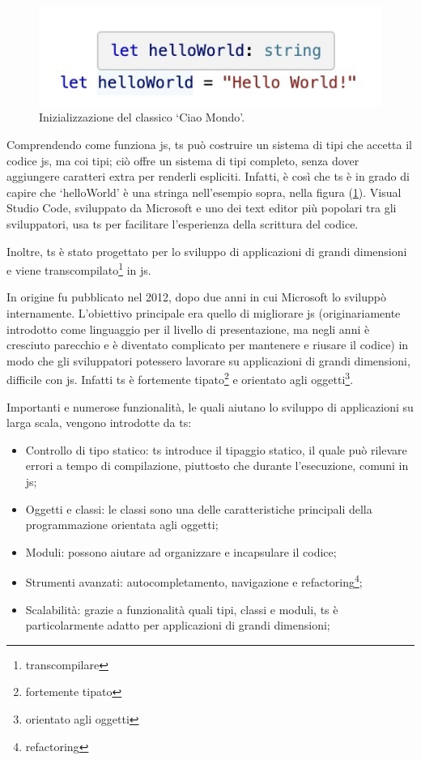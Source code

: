 \begin{figure}[H]
\centering
\includegraphics[width=.8\textwidth]{Images/ts hello.jpg}
\caption{\label{fig:hello}Inizializzazione del classico `Ciao Mondo'.}
\end{figure}

Comprendendo come funziona \acrlong{js}, \acrlong{ts} può costruire un sistema di tipi che accetta il codice \acrlong{js}, ma coi tipi; ciò offre un sistema di tipi completo, senza dover aggiungere caratteri extra per renderli espliciti. Infatti, è così che \acrlong{ts} è in grado di capire che `helloWorld' è una stringa nell'esempio sopra, nella figura (\ref{fig:hello}).
Visual Studio Code, sviluppato da Microsoft e uno dei text editor più popolari tra gli sviluppatori, usa \acrlong{ts} per facilitare l'esperienza della scrittura del codice. 

Inoltre, \acrlong{ts} è stato progettato per lo sviluppo di applicazioni di grandi dimensioni e viene transcompilato\footnote{\glsdesc{transcompilare}} in \acrlong{js}.

In origine fu pubblicato nel 2012, dopo due anni in cui Microsoft lo sviluppò internamente. L'obiettivo principale era quello di migliorare \acrlong{js} (originariamente introdotto come linguaggio per il livello di presentazione, ma negli anni è cresciuto parecchio e è diventato complicato per mantenere e riusare il codice) in modo che gli sviluppatori potessero lavorare su applicazioni di grandi dimensioni, difficile con \acrlong{js}. Infatti \acrlong{ts} è fortemente tipato\footnote{\glsdesc{fortemente tipato}} e orientato agli oggetti\footnote{\glsdesc{orientato agli oggetti}}.

Importanti e numerose funzionalità, le quali aiutano lo sviluppo di applicazioni su larga scala, vengono introdotte da \acrlong{ts}:
\begin{itemize}
    \item Controllo di tipo statico: \acrlong{ts} introduce il tipaggio statico, il quale può rilevare errori a tempo di compilazione, piuttosto che durante l'esecuzione, comuni in \acrlong{js};
    \item Oggetti e classi: le classi sono una delle caratteristiche principali della programmazione orientata agli oggetti;
    \item Moduli: possono aiutare ad organizzare e incapsulare il codice;
    \item Strumenti avanzati: autocompletamento, navigazione e refactoring\footnote{\glsdesc{refactoring}};
    \item Scalabilità: grazie a funzionalità quali tipi, classi e moduli, \acrlong{ts} è particolarmente adatto per applicazioni di grandi dimensioni;
\end{itemize}

